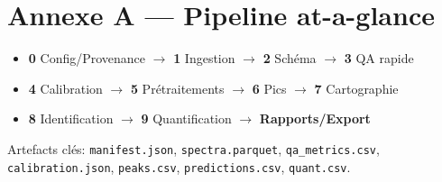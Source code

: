
\section*{Annexe A — Pipeline at-a-glance}
\begin{itemize}[nosep]
\item \textbf{0} Config/Provenance $\rightarrow$ \textbf{1} Ingestion $\rightarrow$ \textbf{2} Schéma $\rightarrow$ \textbf{3} QA rapide
\item \textbf{4} Calibration $\rightarrow$ \textbf{5} Prétraitements $\rightarrow$ \textbf{6} Pics $\rightarrow$ \textbf{7} Cartographie
\item \textbf{8} Identification $\rightarrow$ \textbf{9} Quantification $\rightarrow$ \textbf{Rapports/Export}
\end{itemize}
Artefacts clés: \texttt{manifest.json}, \texttt{spectra.parquet}, \texttt{qa\_metrics.csv}, \texttt{calibration.json}, \texttt{peaks.csv}, \texttt{predictions.csv}, \texttt{quant.csv}.
